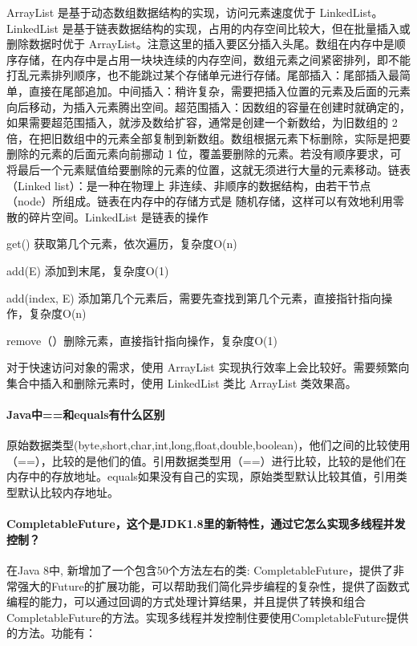 \documentclass[../../../interview-questions.tex]{subfiles}
\begin{document}
ArrayList 是基于动态数组数据结构的实现，访问元素速度优于 LinkedList。LinkedList 是基于链表数据结构的实现，占用的内存空间比较大，但在批量插入或删除数据时优于 ArrayList。注意这里的插入要区分插入头尾。数组在内存中是顺序存储，在内存中是占用一块块连续的内存空间，数组元素之间紧密排列，即不能打乱元素排列顺序，也不能跳过某个存储单元进行存储。尾部插入：尾部插入最简单，直接在尾部追加。中间插入：稍许复杂，需要把插入位置的元素及后面的元素向后移动，为插入元素腾出空间。超范围插入：因数组的容量在创建时就确定的，如果需要超范围插入，就涉及数给扩容，通常是创建一个新数给，为旧数组的 2 倍，在把旧数组中的元素全部复制到新数组。数组根据元素下标删除，实际是把要删除的元素的后面元素向前挪动 1 位，覆盖要删除的元素。若没有顺序要求，可将最后一个元素赋值给要删除的元素的位置，这就无须进行大量的元素移动。链表（Linked list）：是一种在物理上 非连续、非顺序的数据结构，由若干节点（node）所组成。链表在内存中的存储方式是 随机存储，这样可以有效地利用零散的碎片空间。LinkedList 是链表的操作

get() 获取第几个元素，依次遍历，复杂度O(n)

add(E) 添加到末尾，复杂度O(1)

add(index, E) 添加第几个元素后，需要先查找到第几个元素，直接指针指向操作，复杂度O(n)

remove（）删除元素，直接指针指向操作，复杂度O(1)

对于快速访问对象的需求，使用 ArrayList 实现执行效率上会比较好。需要频繁向集合中插入和删除元素时，使用 LinkedList 类比 ArrayList 类效果高。

\paragraph{Java中==和equals有什么区别}

原始数据类型(byte,short,char,int,long,float,double,boolean)，他们之间的比较使用（==），比较的是他们的值。引用数据类型用（==）进行比较，比较的是他们在内存中的存放地址。equals如果没有自己的实现，原始类型默认比较其值，引用类型默认比较内存地址。

\paragraph{CompletableFuture，这个是JDK1.8里的新特性，通过它怎么实现多线程并发控制？}

在Java 8中, 新增加了一个包含50个方法左右的类: CompletableFuture，提供了非常强大的Future的扩展功能，可以帮助我们简化异步编程的复杂性，提供了函数式编程的能力，可以通过回调的方式处理计算结果，并且提供了转换和组合CompletableFuture的方法。实现多线程并发控制住要使用CompletableFuture提供的方法。功能有：
\end{document}
